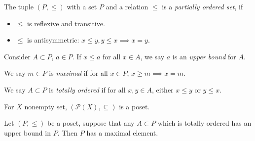 \begin{definition}
	\label{defn:POSet}
	The tuple $(P, \le )$ with a set $P$ and a relation $\le $ is a \textit{partially ordered set}, if
	\begin{itemize}
		\item $\le $ is reflexive and transitive.
		\item $\le $ is antisymmetric: $x\le y, y \le x \implies x = y$.
	\end{itemize}
	Consider $A \subset P$, $a \in P$. If $x \le a$ for all $x \in A$, we say $a$ is an \textit{upper bound} for $A$.

	We say $m \in P$ is \textit{maximal} if for all $x \in P$, $x \ge m \implies x = m$.

	We say $A \subset P$ is \textit{totally ordered} if for all $x, y \in A$, either $x \le y$ or $y \le  x$.
\end{definition}

\begin{example}
	For $X$ nonempty set, $(\mathcal{P}(X), \subseteq )$ is a poset.
\end{example}

\begin{lemma}
	\label{lem:Zorn}
	Let $(P, \le )$ be a poset, suppose that any $A \subset P$ which is totally ordered has an upper bound in $P$. Then $P$ has a maximal element.
\end{lemma}
